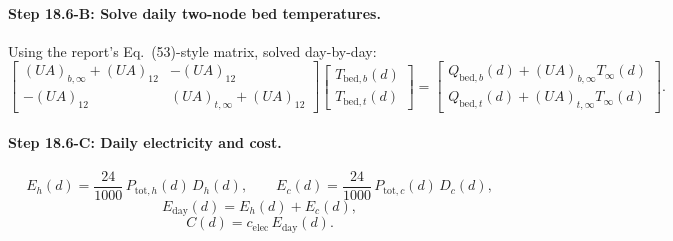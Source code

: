 \documentclass[11pt]{article}
\begin{document}
\paragraph{Step 18.6-B: Solve daily two-node bed temperatures.}
Using the report's Eq.~(53)-style matrix, solved day-by-day:
\begin{equation}
\begin{bmatrix}
(UA)_{b,\infty}+(UA)_{12} & -(UA)_{12}\\
-(UA)_{12} & (UA)_{t,\infty}+(UA)_{12}
\end{bmatrix}
\begin{bmatrix}
T_{\mathrm{bed},b}(d)\\
T_{\mathrm{bed},t}(d)
\end{bmatrix}
=
\begin{bmatrix}
Q_{\mathrm{bed},b}(d)+(UA)_{b,\infty}T_\infty(d)\\
Q_{\mathrm{bed},t}(d)+(UA)_{t,\infty}T_\infty(d)
\end{bmatrix}.
\tag{53}
\end{equation}

\paragraph{Step 18.6-C: Daily electricity and cost.}
\begin{equation}
E_h(d)=\frac{24}{1000}\,P_{\mathrm{tot},h}(d)\,D_h(d),\qquad
E_c(d)=\frac{24}{1000}\,P_{\mathrm{tot},c}(d)\,D_c(d),
\tag{18.6C-1}
\end{equation}
\begin{equation}
E_{\mathrm{day}}(d)=E_h(d)+E_c(d),
\tag{18.6C-2}
\end{equation}
\begin{equation}
C(d)=c_{\mathrm{elec}}\,E_{\mathrm{day}}(d).
\tag{18.6C-3}
\end{equation}
\end{document}
